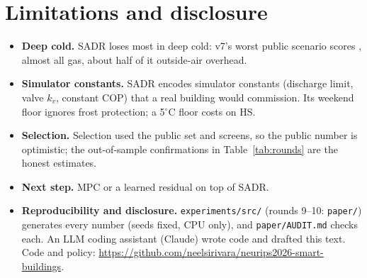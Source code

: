 \documentclass{article}
\begin{document}
\section{Limitations and disclosure}
\begin{itemize}
\item \textbf{Deep cold.} SADR loses most in deep cold: v7's worst public scenario scores \RFMaxCandScore, almost all gas, about half of it outside-air overhead.
\item \textbf{Simulator constants.} SADR encodes simulator constants (discharge limit, valve $k_v$, constant COP) that a real building would commission. Its weekend floor ignores frost protection; a 5$^\circ$C floor costs \RSixScrCTenHsRelAbs{} on HS.
\item \textbf{Selection.} Selection used the public set and screens, so the public number is optimistic; the out-of-sample confirmations in Table~\ref{tab:rounds} are the honest estimates.
\item \textbf{Next step.} MPC or a learned residual on top of SADR.
\item \textbf{Reproducibility and disclosure.} \texttt{experiments/src/} (rounds 9--10: \texttt{paper/}) generates every number (seeds fixed, CPU only), and \texttt{paper/AUDIT.md} checks each. An LLM coding assistant (Claude) wrote code and drafted this text. Code and policy: \url{https://github.com/neelsirivara/neurips2026-smart-buildings}.
\end{itemize}



\clearpage
\appendix
\end{document}
